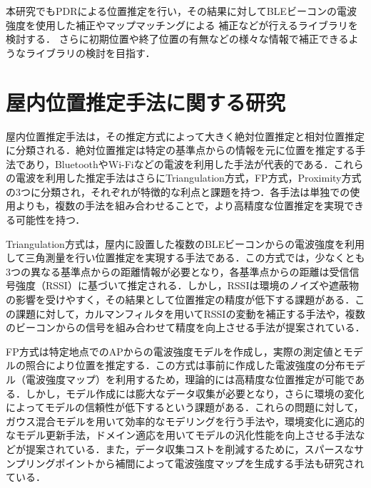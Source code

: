 本研究でもPDRによる位置推定を行い，その結果に対してBLEビーコンの電波強度を使用した補正やマップマッチングによる
補正などが行えるライブラリを検討する．
さらに初期位置や終了位置の有無などの様々な情報で補正できるようなライブラリの検討を目指す．



\section{屋内位置推定手法に関する研究}

屋内位置推定手法は，その推定方式によって大きく絶対位置推定と相対位置推定に分類される．絶対位置推定は特定の基準点からの情報を元に位置を推定する手法であり，BluetoothやWi-Fiなどの電波を利用した手法が代表的である．これらの電波を利用した推定手法はさらにTriangulation方式，FP方式，Proximity方式の3つに分類され\cite{wireless-lan-summary}，それぞれが特徴的な利点と課題を持つ．各手法は単独での使用よりも，複数の手法を組み合わせることで，より高精度な位置推定を実現できる可能性を持つ．

Triangulation方式は，屋内に設置した複数のBLEビーコンからの電波強度を利用して三角測量を行い位置推定を実現する手法である．この方式では，少なくとも3つの異なる基準点からの距離情報が必要となり，各基準点からの距離は受信信号強度（RSSI）に基づいて推定される\cite{ble-indoor}．しかし，RSSIは環境のノイズや遮蔽物の影響を受けやすく，その結果として位置推定の精度が低下する課題がある．この課題に対して，カルマンフィルタを用いてRSSIの変動を補正する手法\cite{triangulation-kalman}や，複数のビーコンからの信号を組み合わせて精度を向上させる手法\cite{ble-tandem}が提案されている．

FP方式は特定地点でのAPからの電波強度モデルを作成し，実際の測定値とモデルの照合により位置を推定する．この方式は事前に作成した電波強度の分布モデル（電波強度マップ）を利用するため，理論的には高精度な位置推定が可能である．しかし，モデル作成には膨大なデータ収集が必要となり，さらに環境の変化によってモデルの信頼性が低下するという課題がある．これらの問題に対して，ガウス混合モデルを用いて効率的なモデリングを行う手法\cite{gaussian-mixture-model}や，環境変化に適応的なモデル更新手法\cite{fingerprint-auto-update}，ドメイン適応を用いてモデルの汎化性能を向上させる手法\cite{wi-fi-fingerprint-domain}などが提案されている．また，データ収集コストを削減するために，スパースなサンプリングポイントから補間によって電波強度マップを生成する手法\cite{wireless-lan-cost-reduction}も研究されている．

